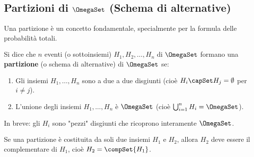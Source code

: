 \subsection{Partizioni di \texorpdfstring{$\OmegaSet$}{Omega} (Schema di alternative)}
Una partizione è un concetto fondamentale, specialmente per la formula delle probabilità totali.

\begin{definition}
Si dice che $n$ eventi (o sottoinsiemi) $H_1, H_2, \dots, H_n$ di $\OmegaSet$ formano una \textbf{partizione} (o schema di alternative) di $\OmegaSet$ se:
\begin{enumerate}
    \item Gli insiemi $H_1, \dots, H_n$ sono a due a due disgiunti (cioè $H_i \capSet H_j = \emptyset$ per $i \neq j$).
    \item L'unione degli insiemi $H_1, \dots, H_n$ è $\OmegaSet$ (cioè $\bigcup_{i=1}^n H_i = \OmegaSet$).
\end{enumerate}
In breve: gli $H_i$ sono "pezzi" disgiunti che ricoprono interamente $\OmegaSet$.
\end{definition}

\begin{remark}
Se una partizione è costituita da soli due insiemi $H_1$ e $H_2$, allora $H_2$ deve essere il complementare di $H_1$, cioè $H_2 = \compSet{H_1}$.
\end{remark}

